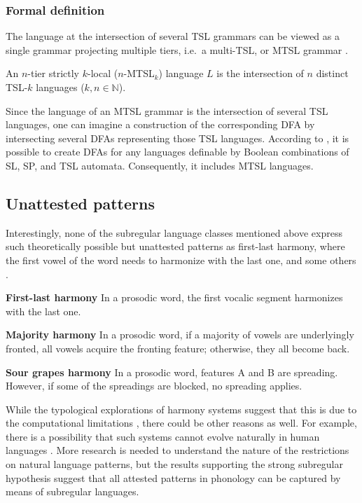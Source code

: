 \subsubsection{Formal definition}

The language at the intersection of several TSL grammars can be viewed as a single grammar projecting multiple tiers, i.e.\ a multi-TSL, or MTSL grammar \citep{DeSantoGraf19FG}.

\begin{definition}
An $n$-tier strictly $k$-local ($n$-MTSL$_k$) language $L$ is the intersection of $n$ distinct TSL-$k$ languages ($k,n \in \mathbb{N}$).
\end{definition}

Since the language of an MTSL grammar is the intersection of several TSL languages, one can imagine a construction of the corresponding DFA by intersecting several DFAs representing those TSL languages.
According to \cite{LambertRogers2020}, it is possible to create DFAs for any languages definable by Boolean combinations of SL, SP, and TSL automata.
Consequently, it includes MTSL languages.




\subsection{Unattested patterns}
\label{unattestedpatternssubseq}


Interestingly, none of the subregular language classes mentioned above express such theoretically possible but unattested patterns as first-last harmony, where the first vowel of the word needs to harmonize with the last one, and some others \citep{Lai15,Avcu2018}.

\medskip
\noindent \textbf{First-last harmony} \quad In a prosodic word, the first vocalic segment harmonizes with the last one.

\noindent \textbf{Majority harmony} \quad In a prosodic word, if a majority of vowels are underlyingly fronted, all vowels acquire the fronting feature; otherwise, they all become back.

\noindent \textbf{Sour grapes harmony} \quad In a prosodic word, features A and B are spreading.
However, if some of the spreadings are blocked, no spreading applies.
\medskip

While the typological explorations of harmony systems suggest that this is due to the computational limitations \citep{Heinz-Lai-2013-VHS}, there could be other reasons as well.
For example, there is a possibility that such systems cannot evolve naturally in human languages \citep{Blevins2004}.
More research is needed to understand the nature of the restrictions on natural language patterns, but the results supporting the strong subregular hypothesis suggest that all attested patterns in phonology can be captured by means of subregular languages.

